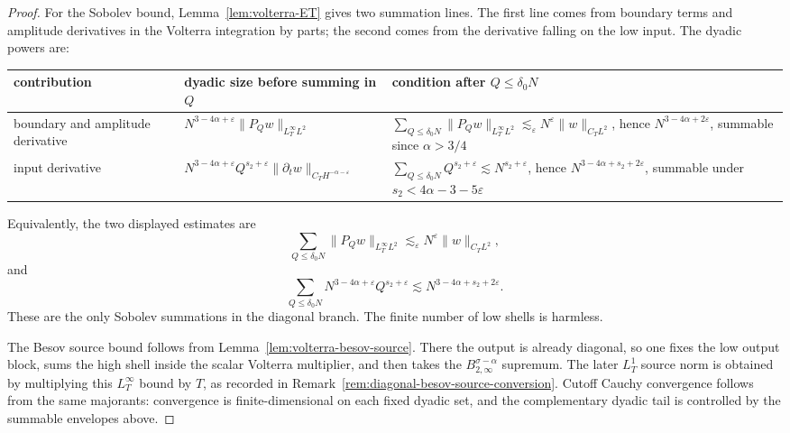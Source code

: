 \documentclass[10pt]{amsart}
\renewcommand{\arraystretch}{1.03}
\numberwithin{equation}{section}
\theoremstyle{plain}
\theoremstyle{definition}
\theoremstyle{remark}
\newcommand{\eps}{\varepsilon}
\begin{document}
\begin{proof}
For the Sobolev bound, Lemma~\ref{lem:volterra-ET} gives two summation lines.  The first line comes from boundary terms and amplitude derivatives in the Volterra integration by parts; the second comes from the derivative falling on the low input.  The dyadic powers are:
\begin{center}
\footnotesize
\renewcommand{\arraystretch}{1.14}
\begin{tabular}{>{\raggedright\arraybackslash}p{}>{\raggedright\arraybackslash}p{}>{\raggedright\arraybackslash}p{}}
\toprule
contribution & dyadic size before summing in $Q$ & condition after $Q\le\delta_0N$ \\
\midrule
boundary and amplitude derivative &
$N^{3-4\alpha+\eps}\|P_Qw\|_{L_T^\infty L^2}$ &
$\sum_{Q\le\delta_0N}\|P_Qw\|_{L_T^\infty L^2}\lesssim_\eps N^\eps\|w\|_{C_TL^2}$, hence $N^{3-4\alpha+2\eps}$, summable since $\alpha>3/4$ \\
input derivative &
$N^{3-4\alpha+\eps}Q^{s_2+\eps}\|\partial_tw\|_{C_TH^{-\alpha-\eps}}$ &
$\sum_{Q\le\delta_0N}Q^{s_2+\eps}\lesssim N^{s_2+\eps}$, hence $N^{3-4\alpha+s_2+2\eps}$, summable under $s_2<4\alpha-3-5\eps$ \\
\bottomrule
\end{tabular}
\end{center}
Equivalently, the two displayed estimates are
\begin{equation}
        \sum_{Q\le \delta_0N}\|P_Qw\|_{L_T^\infty L^2}
        \lesssim_\eps N^\eps\|w\|_{C_TL^2},
\end{equation}
and
\begin{equation}
        \sum_{Q\le\delta_0N}N^{3-4\alpha+\eps}Q^{s_2+\eps}
        \lesssim N^{3-4\alpha+s_2+2\eps}.
\end{equation}
These are the only Sobolev summations in the diagonal branch.  The finite number of low shells is harmless.

The Besov source bound follows from Lemma~\ref{lem:volterra-besov-source}.  There the output is already diagonal, so one fixes the low output block, sums the high shell inside the scalar Volterra multiplier, and then takes the $B_{2,\infty}^{\sigma-\alpha}$ supremum.  The later $L_T^1$ source norm is obtained by multiplying this $L_T^\infty$ bound by $T$, as recorded in Remark~\ref{rem:diagonal-besov-source-conversion}.  Cutoff Cauchy convergence follows from the same majorants: convergence is finite-dimensional on each fixed dyadic set, and the complementary dyadic tail is controlled by the summable envelopes above.
\end{proof}
\end{document}

